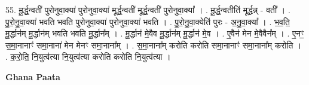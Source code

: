 \documentclass[17pt]{extarticle}
\begin{document}
55. मू॒र्द्ध॒न्वती॑ पुरोनुवा॒क्या॑ पुरोनुवा॒क्या॑ मूर्द्ध॒न्वती॑ मूर्द्ध॒न्वती॑ पुरोनुवा॒क्या᳚ । . मू॒र्द्ध॒न्वतीति॑ मूर्द्धन्न् - वती᳚ । . पु॒रो॒नु॒वा॒क्या॑ भवति भवति पुरोनुवा॒क्या॑ पुरोनुवा॒क्या॑ भवति । . पु॒रो॒नु॒वा॒क्येति॑ पुरः - अ॒नु॒वा॒क्या᳚ । . भ॒व॒ति॒ मू॒र्द्धान॑म् मू॒र्द्धान॑म् भवति भवति मू॒र्द्धान᳚म् । . मू॒र्द्धान॑ मे॒वैव मू॒र्द्धान॑म् मू॒र्द्धान॑ मे॒व । . ए॒वैन॑ मेन मे॒वैवैन᳚म् । . ए॒नꣳ॒॒ स॒मा॒नानाꣳ॑ समा॒नाना॑ मेन मेनꣳ समा॒नाना᳚म् । . स॒मा॒नाना᳚म् करोति करोति समा॒नानाꣳ॑ समा॒नाना᳚म् करोति । . क॒रो॒ति॒ नि॒युत्व॑त्या नि॒युत्व॑त्या करोति करोति नि॒युत्व॑त्या । \newline

\textbf{Ghana Paata } \newline
\end{document}
